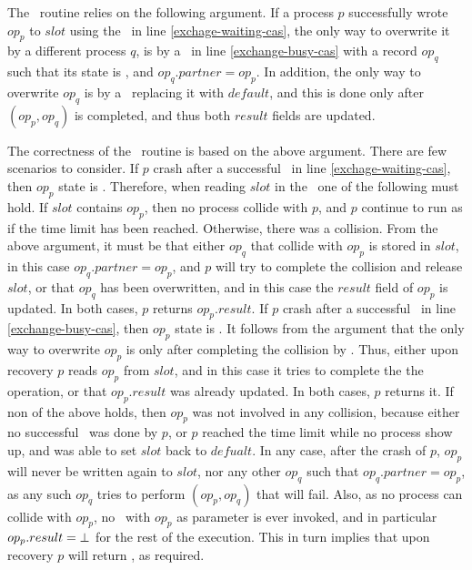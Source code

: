 The \recoverExchange\ routine relies on the following argument. If a process $p$ successfully wrote $op_p$ to $slot$ using the \CAS\ in line \ref{exchage-waiting-cas}, the only way to overwrite it by a different process $q$, is by a \CAS\ in line \ref{exchange-busy-cas} with a record $op_q$ such that its state is \busy, and $op_q.partner = op_p$. In addition, the only way to overwrite $op_q$ is by a \CAS\ replacing it with $default$, and this is done only after \switchPair$(op_p, op_q)$ is completed, and thus both $result$ fields are updated.

The correctness of the \recoverExchange\ routine is based on the above argument. There are few scenarios to consider.
If $p$ crash after a successful \CAS\ in line \ref{exchage-waiting-cas}, then $op_p$ state is \waiting. Therefore, when reading $slot$ in the \recoverExchange\ one of the following must hold. If $slot$ contains $op_p$, then no process collide with $p$, and $p$ continue to run as if the time limit has been reached. Otherwise, there was a collision. From the above argument, it must be that either $op_q$ that collide with $op_p$ is stored in $slot$, in this case $op_q.partner = op_p$, and $p$ will try to complete the collision and release $slot$, or that $op_q$ has been overwritten, and in this case the $result$ field of $op_p$ is updated. In both cases, $p$ returns $op_p.result$.
If $p$ crash after a successful \CAS\ in line \ref{exchange-busy-cas}, then $op_p$ state is \busy. It follows from the argument that the only way to overwrite $op_p$ is only after completing the collision by \switchPair. Thus, either upon recovery $p$ reads $op_p$ from $slot$, and in this case it tries to complete the the operation, or that $op_p.result$ was already updated. In both cases, $p$ returns it.
If non of the above holds, then $op_p$ was not involved in any collision, because either no successful \CAS\ was done by $p$, or $p$ reached the time limit while no process show up, and was able to set $slot$ back to $defualt$. In any case, after the crash of $p$, $op_p$ will never be written again to $slot$, nor any other $op_q$ such that $op_q.partner = op_p$, as any such $op_q$ tries to perform \CAS$(op_p,op_q)$ that will fail. Also, as no process can collide with $op_p$, no \switchPair\ with $op_p$ as parameter is ever invoked, and in particular $op_p.result = \mbox{$\bot$}$ for the rest of the execution. This in turn implies that upon recovery $p$ will return \fail, as required.





